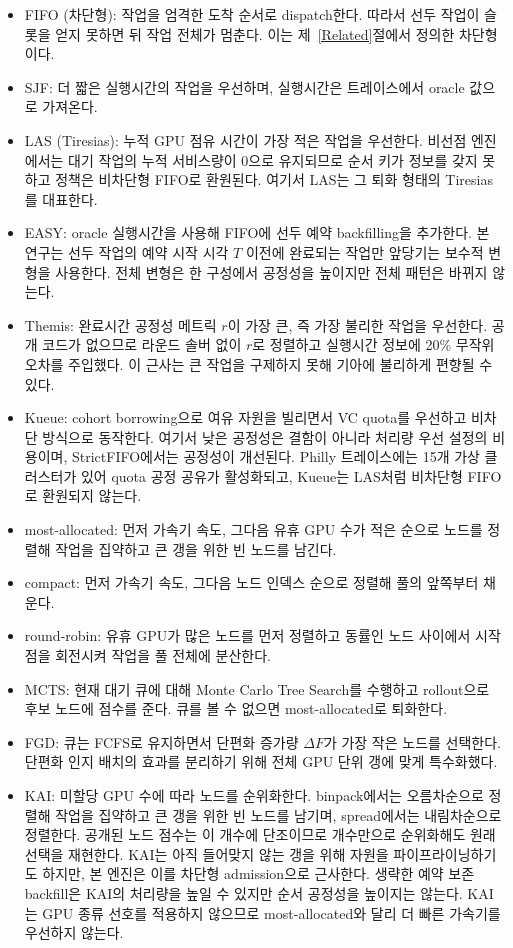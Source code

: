 \documentclass{ieeetj}
\begin{document}
\begin{itemize}
\item FIFO (차단형): 작업을 엄격한 도착 순서로 dispatch한다. 따라서 선두 작업이 슬롯을 얻지 못하면 뒤 작업 전체가 멈춘다. 이는 제~\ref{Related}절에서 정의한 차단형이다.
\item SJF: 더 짧은 실행시간의 작업을 우선하며, 실행시간은 트레이스에서 oracle 값으로 가져온다.
\item LAS (Tiresias): 누적 GPU 점유 시간이 가장 적은 작업을 우선한다. 비선점 엔진에서는 대기 작업의 누적 서비스량이 0으로 유지되므로 순서 키가 정보를 갖지 못하고 정책은 비차단형 FIFO로 환원된다. 여기서 LAS는 그 퇴화 형태의 Tiresias를 대표한다.
\item EASY: oracle 실행시간을 사용해 FIFO에 선두 예약 backfilling을 추가한다. 본 연구는 선두 작업의 예약 시작 시각 $T$ 이전에 완료되는 작업만 앞당기는 보수적 변형을 사용한다. 전체 변형은 한 구성에서 공정성을 높이지만 전체 패턴은 바뀌지 않는다.
\item Themis: 완료시간 공정성 메트릭 $r$이 가장 큰, 즉 가장 불리한 작업을 우선한다. 공개 코드가 없으므로 라운드 솔버 없이 $r$로 정렬하고 실행시간 정보에 20\% 무작위 오차를 주입했다. 이 근사는 큰 작업을 구제하지 못해 기아에 불리하게 편향될 수 있다.
\item Kueue: cohort borrowing으로 여유 자원을 빌리면서 VC quota를 우선하고 비차단 방식으로 동작한다. 여기서 낮은 공정성은 결함이 아니라 처리량 우선 설정의 비용이며, StrictFIFO에서는 공정성이 개선된다. Philly 트레이스에는 15개 가상 클러스터가 있어 quota 공정 공유가 활성화되고, Kueue는 LAS처럼 비차단형 FIFO로 환원되지 않는다.
\item most-allocated: 먼저 가속기 속도, 그다음 유휴 GPU 수가 적은 순으로 노드를 정렬해 작업을 집약하고 큰 갱을 위한 빈 노드를 남긴다.
\item compact: 먼저 가속기 속도, 그다음 노드 인덱스 순으로 정렬해 풀의 앞쪽부터 채운다.
\item round-robin: 유휴 GPU가 많은 노드를 먼저 정렬하고 동률인 노드 사이에서 시작점을 회전시켜 작업을 풀 전체에 분산한다.
\item MCTS: 현재 대기 큐에 대해 Monte Carlo Tree Search를 수행하고 rollout으로 후보 노드에 점수를 준다. 큐를 볼 수 없으면 most-allocated로 퇴화한다.
\item FGD: 큐는 FCFS로 유지하면서 단편화 증가량 $\Delta F$가 가장 작은 노드를 선택한다. 단편화 인지 배치의 효과를 분리하기 위해 전체 GPU 단위 갱에 맞게 특수화했다.
\item KAI: 미할당 GPU 수에 따라 노드를 순위화한다. binpack에서는 오름차순으로 정렬해 작업을 집약하고 큰 갱을 위한 빈 노드를 남기며, spread에서는 내림차순으로 정렬한다. 공개된 노드 점수는 이 개수에 단조이므로 개수만으로 순위화해도 원래 선택을 재현한다. KAI는 아직 들어맞지 않는 갱을 위해 자원을 파이프라이닝하기도 하지만, 본 엔진은 이를 차단형 admission으로 근사한다. 생략한 예약 보존 backfill은 KAI의 처리량을 높일 수 있지만 순서 공정성을 높이지는 않는다. KAI는 GPU 종류 선호를 적용하지 않으므로 most-allocated와 달리 더 빠른 가속기를 우선하지 않는다.

\end{itemize}
\end{document}
